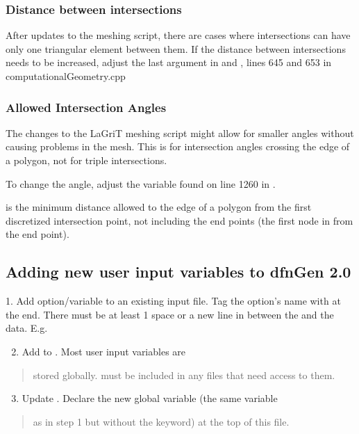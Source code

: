 \documentclass[letterpaper,10pt,english]{sphinxmanual}
\begin{document}
\subsubsection{Distance between intersections}
\label{dfngen:distance-between-intersections}
After updates to
the meshing script, there are cases where intersections can have only one
triangular element between them. If the distance between intersections needs to
be increased, adjust the last argument in 
and , lines 645 and 653 in
computationalGeometry.cpp


\subsubsection{Allowed Intersection Angles}
\label{dfngen:allowed-intersection-angles}
The changes to the
LaGriT meshing script might allow for smaller angles without causing problems in
the mesh. This is for intersection angles crossing the edge of a polygon, not
for triple intersections.

To change the angle, adjust the variable  found
on line 1260 in .

 is the minimum distance allowed to the edge of a polygon from the
first discretized intersection point, not including the end points (the first
node in from the end point).


\subsection{Adding new user input variables to dfnGen 2.0}
\label{dfngen:adding-new-user-input-variables-to-dfngen-2-0}
1.      Add option/variable to an
existing input file. Tag the option’s name with \code{:} at the end.  There must be
at least 1 space or a new line in between the \code{:} and the data.  E.g.
\begin{enumerate}
\setcounter{enumi}{1}
\item {} 
Add  to . Most user input variables are

\end{enumerate}
\begin{quote}

stored globally.  must be included in any files that need access
to them.
\end{quote}
\begin{enumerate}
\setcounter{enumi}{2}
\item {} 
Update . Declare the new global variable (the same variable

\end{enumerate}
\begin{quote}

as in step 1 but without the  keyword) at the top of this file.
\end{quote}
\end{document}
